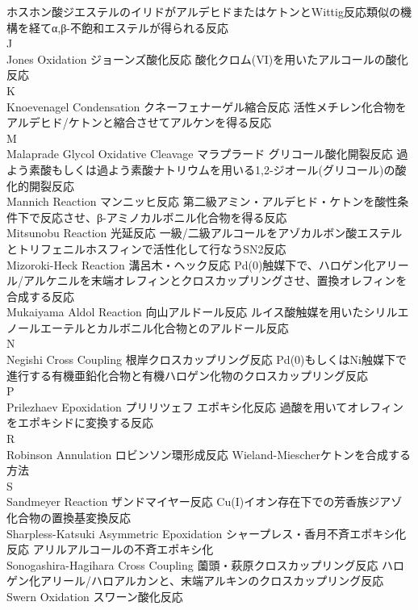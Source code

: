 \documentclass[dvipdfmx,uplatex]{jsarticle}
\begin{document}
	ホスホン酸ジエステルのイリドがアルデヒドまたはケトンとWittig反応類似の機構を経てα,β-不飽和エステルが得られる反応 \\
J \\
Jones Oxidation	ジョーンズ酸化反応
	酸化クロム(VI)を用いたアルコールの酸化反応 \\
K \\
Knoevenagel Condensation	クネーフェナーゲル縮合反応
	活性メチレン化合物をアルデヒド/ケトンと縮合させてアルケンを得る反応 \\
M \\
Malaprade Glycol Oxidative Cleavage	マラプラード グリコール酸化開裂反応
	過よう素酸もしくは過よう素酸ナトリウムを用いる1,2-ジオール(グリコール)の酸化的開裂反応 \\
Mannich Reaction	マンニッヒ反応
	第二級アミン・アルデヒド・ケトンを酸性条件下で反応させ、β-アミノカルボニル化合物を得る反応 \\ 
Mitsunobu Reaction	光延反応
	一級/二級アルコールをアゾカルボン酸エステルとトリフェニルホスフィンで活性化して行なうSN2反応 \\
Mizoroki-Heck Reaction	溝呂木・ヘック反応
	Pd(0)触媒下で、ハロゲン化アリール/アルケニルを末端オレフィンとクロスカップリングさせ、置換オレフィンを合成する反応 \\
Mukaiyama Aldol Reaction	向山アルドール反応
	ルイス酸触媒を用いたシリルエノールエーテルとカルボニル化合物とのアルドール反応 \\
N \\
Negishi Cross Coupling	根岸クロスカップリング反応
	Pd(0)もしくはNi触媒下で進行する有機亜鉛化合物と有機ハロゲン化物のクロスカップリング反応 \\
P \\
Prilezhaev Epoxidation	プリリツェフ エポキシ化反応
	過酸を用いてオレフィンをエポキシドに変換する反応 \\
R \\
Robinson Annulation	ロビンソン環形成反応
	Wieland-Miescherケトンを合成する方法 \\
S \\
Sandmeyer Reaction	ザンドマイヤー反応
	Cu(I)イオン存在下での芳香族ジアゾ化合物の置換基変換反応 \\
Sharpless-Katsuki Asymmetric Epoxidation	シャープレス・香月不斉エポキシ化反応
	アリルアルコールの不斉エポキシ化 \\
Sonogashira-Hagihara Cross Coupling	薗頭・萩原クロスカップリング反応
	ハロゲン化アリール/ハロアルカンと、末端アルキンのクロスカップリング反応 \\
Swern Oxidation	スワーン酸化反応
\end{document}
